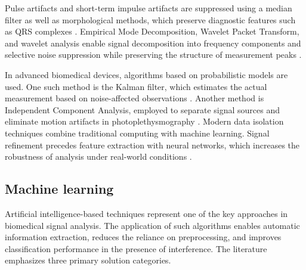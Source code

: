 \documentclass[journal]{IEEEtran}
\begin{document}
\newpage
Pulse artifacts and short-term impulse artifacts are suppressed using a median filter as well as morphological methods, which preserve diagnostic features such as QRS complexes \cite{6}. Empirical Mode Decomposition, Wavelet Packet Transform, and wavelet analysis enable signal decomposition into frequency components and selective noise suppression while preserving the structure of measurement peaks \cite{7}.

In advanced biomedical devices, algorithms based on probabilistic models are used. One such method is the Kalman filter, which estimates the actual measurement based on noise-affected observations \cite{8}. Another method is Independent Component Analysis, employed to separate signal sources and eliminate motion artifacts in photoplethysmography \cite{9}. Modern data isolation techniques combine traditional computing with machine learning. Signal refinement precedes feature extraction with neural networks, which increases the robustness of analysis under real-world conditions \cite{10}.

\subsection{Machine learning}
Artificial intelligence-based techniques represent one of the key approaches in biomedical signal analysis. The application of such algorithms enables automatic information extraction, reduces the reliance on preprocessing, and improves classification performance in the presence of interference. The literature emphasizes three primary solution categories.
\end{document}
